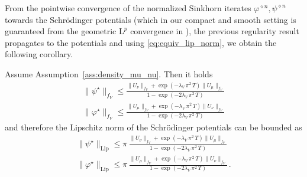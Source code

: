 \documentclass[final,12pt]{colt2023} %
\newcommand{\bes}{\begin{equation}}
\newcommand{\ees}{\end{equation}}
\newcommand{\be}{\begin{equation}}
\newcommand{\ee}{\end{equation}}
\def\mrl{\mathrm{L}}
\def\rml{\mrl}
\def\varphistar{\varphi^\star}
\def\psistar{\psi^{\star}}
\begin{document}
From the pointwise convergence of the normalized Sinkhorn iterates $\varphi^{\diamond n},\psi^{\diamond n}$ towards the Schr\"odinger potentials (which in our compact and smooth setting is guaranteed from the geometric $\rml^p$ convergence in \cite{marinogerolin2020}), the previous regularity result propagates to the potentials and using \eqref{eq:equiv_lip_norm},  we obtain the following corollary.
\begin{corollary}
  Assume Assumption~\ref{ass:density_mu_nu}. Then it holds 
\be\label{eq:fnorm_bound3}
\begin{split}
\|\psistar\|_{f_V} \leq \frac{\|U_{\nu}\|_{f_V}+\exp(-\lambda_V\,\pi^2\, T)\|U_{\mu}\|_{f_V}}{1-\exp(-2\lambda_V \,\pi^2\,T)} \\
\|\varphistar\|_{f_V}\leq  \frac{\|U_{\mu}\|_{f_V}+\exp(-\lambda_V \,\pi^2\,T)\|U_{\nu}\|_{f_V}}{1-\exp(-2\lambda_V \,\pi^2\,T)}
\end{split}
\ee
and therefore the Lipschitz norm of the Schr\"odinger potentials can be bounded as
\bes
\begin{split}
\|\psistar\|_{\mathrm{Lip}} \leq \pi\,\frac{\|U_{\nu}\|_{f_V}+\exp(-\lambda_V \,\pi^2\,T)\|U_{\mu}\|_{f_V}}{1-\exp(-2\lambda_V\,\pi^2\, T)} \\
\|\varphistar\|_{\mathrm{Lip}}\leq  \pi\,\frac{\|U_{\mu}\|_{f_V}+\exp(-\lambda_V \,\pi^2\,T)\|U_{\nu}\|_{f_V}}{1-\exp(-2\lambda_V\,\pi^2\, T)}\,.
\end{split}
\ees
\end{corollary}
\end{document}
